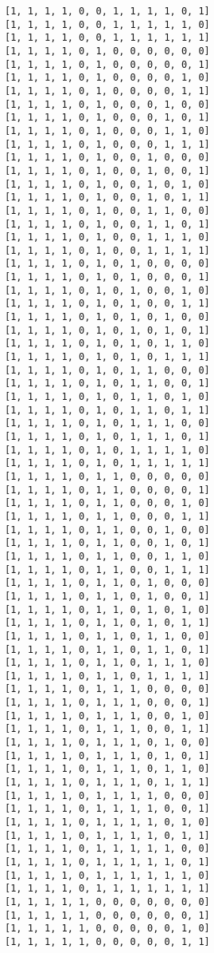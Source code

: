 \documentclass[11pt]{article}
\begin{document}
\begin{Verbatim}[commandchars=\\\{\}]
[1, 1, 1, 1, 0, 0, 1, 1, 1, 1, 0, 1]
[1, 1, 1, 1, 0, 0, 1, 1, 1, 1, 1, 0]
[1, 1, 1, 1, 0, 0, 1, 1, 1, 1, 1, 1]
[1, 1, 1, 1, 0, 1, 0, 0, 0, 0, 0, 0]
[1, 1, 1, 1, 0, 1, 0, 0, 0, 0, 0, 1]
[1, 1, 1, 1, 0, 1, 0, 0, 0, 0, 1, 0]
[1, 1, 1, 1, 0, 1, 0, 0, 0, 0, 1, 1]
[1, 1, 1, 1, 0, 1, 0, 0, 0, 1, 0, 0]
[1, 1, 1, 1, 0, 1, 0, 0, 0, 1, 0, 1]
[1, 1, 1, 1, 0, 1, 0, 0, 0, 1, 1, 0]
[1, 1, 1, 1, 0, 1, 0, 0, 0, 1, 1, 1]
[1, 1, 1, 1, 0, 1, 0, 0, 1, 0, 0, 0]
[1, 1, 1, 1, 0, 1, 0, 0, 1, 0, 0, 1]
[1, 1, 1, 1, 0, 1, 0, 0, 1, 0, 1, 0]
[1, 1, 1, 1, 0, 1, 0, 0, 1, 0, 1, 1]
[1, 1, 1, 1, 0, 1, 0, 0, 1, 1, 0, 0]
[1, 1, 1, 1, 0, 1, 0, 0, 1, 1, 0, 1]
[1, 1, 1, 1, 0, 1, 0, 0, 1, 1, 1, 0]
[1, 1, 1, 1, 0, 1, 0, 0, 1, 1, 1, 1]
[1, 1, 1, 1, 0, 1, 0, 1, 0, 0, 0, 0]
[1, 1, 1, 1, 0, 1, 0, 1, 0, 0, 0, 1]
[1, 1, 1, 1, 0, 1, 0, 1, 0, 0, 1, 0]
[1, 1, 1, 1, 0, 1, 0, 1, 0, 0, 1, 1]
[1, 1, 1, 1, 0, 1, 0, 1, 0, 1, 0, 0]
[1, 1, 1, 1, 0, 1, 0, 1, 0, 1, 0, 1]
[1, 1, 1, 1, 0, 1, 0, 1, 0, 1, 1, 0]
[1, 1, 1, 1, 0, 1, 0, 1, 0, 1, 1, 1]
[1, 1, 1, 1, 0, 1, 0, 1, 1, 0, 0, 0]
[1, 1, 1, 1, 0, 1, 0, 1, 1, 0, 0, 1]
[1, 1, 1, 1, 0, 1, 0, 1, 1, 0, 1, 0]
[1, 1, 1, 1, 0, 1, 0, 1, 1, 0, 1, 1]
[1, 1, 1, 1, 0, 1, 0, 1, 1, 1, 0, 0]
[1, 1, 1, 1, 0, 1, 0, 1, 1, 1, 0, 1]
[1, 1, 1, 1, 0, 1, 0, 1, 1, 1, 1, 0]
[1, 1, 1, 1, 0, 1, 0, 1, 1, 1, 1, 1]
[1, 1, 1, 1, 0, 1, 1, 0, 0, 0, 0, 0]
[1, 1, 1, 1, 0, 1, 1, 0, 0, 0, 0, 1]
[1, 1, 1, 1, 0, 1, 1, 0, 0, 0, 1, 0]
[1, 1, 1, 1, 0, 1, 1, 0, 0, 0, 1, 1]
[1, 1, 1, 1, 0, 1, 1, 0, 0, 1, 0, 0]
[1, 1, 1, 1, 0, 1, 1, 0, 0, 1, 0, 1]
[1, 1, 1, 1, 0, 1, 1, 0, 0, 1, 1, 0]
[1, 1, 1, 1, 0, 1, 1, 0, 0, 1, 1, 1]
[1, 1, 1, 1, 0, 1, 1, 0, 1, 0, 0, 0]
[1, 1, 1, 1, 0, 1, 1, 0, 1, 0, 0, 1]
[1, 1, 1, 1, 0, 1, 1, 0, 1, 0, 1, 0]
[1, 1, 1, 1, 0, 1, 1, 0, 1, 0, 1, 1]
[1, 1, 1, 1, 0, 1, 1, 0, 1, 1, 0, 0]
[1, 1, 1, 1, 0, 1, 1, 0, 1, 1, 0, 1]
[1, 1, 1, 1, 0, 1, 1, 0, 1, 1, 1, 0]
[1, 1, 1, 1, 0, 1, 1, 0, 1, 1, 1, 1]
[1, 1, 1, 1, 0, 1, 1, 1, 0, 0, 0, 0]
[1, 1, 1, 1, 0, 1, 1, 1, 0, 0, 0, 1]
[1, 1, 1, 1, 0, 1, 1, 1, 0, 0, 1, 0]
[1, 1, 1, 1, 0, 1, 1, 1, 0, 0, 1, 1]
[1, 1, 1, 1, 0, 1, 1, 1, 0, 1, 0, 0]
[1, 1, 1, 1, 0, 1, 1, 1, 0, 1, 0, 1]
[1, 1, 1, 1, 0, 1, 1, 1, 0, 1, 1, 0]
[1, 1, 1, 1, 0, 1, 1, 1, 0, 1, 1, 1]
[1, 1, 1, 1, 0, 1, 1, 1, 1, 0, 0, 0]
[1, 1, 1, 1, 0, 1, 1, 1, 1, 0, 0, 1]
[1, 1, 1, 1, 0, 1, 1, 1, 1, 0, 1, 0]
[1, 1, 1, 1, 0, 1, 1, 1, 1, 0, 1, 1]
[1, 1, 1, 1, 0, 1, 1, 1, 1, 1, 0, 0]
[1, 1, 1, 1, 0, 1, 1, 1, 1, 1, 0, 1]
[1, 1, 1, 1, 0, 1, 1, 1, 1, 1, 1, 0]
[1, 1, 1, 1, 0, 1, 1, 1, 1, 1, 1, 1]
[1, 1, 1, 1, 1, 0, 0, 0, 0, 0, 0, 0]
[1, 1, 1, 1, 1, 0, 0, 0, 0, 0, 0, 1]
[1, 1, 1, 1, 1, 0, 0, 0, 0, 0, 1, 0]
[1, 1, 1, 1, 1, 0, 0, 0, 0, 0, 1, 1]

\end{Verbatim}
\end{document}
